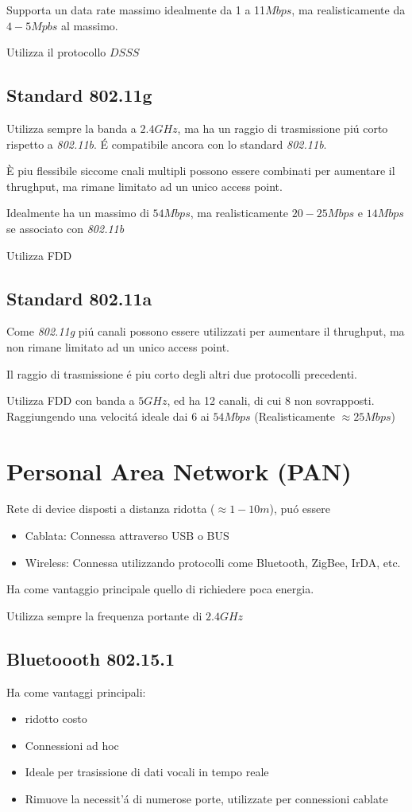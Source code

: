 \documentclass{article}
\begin{document}
Supporta un data rate massimo idealmente da 1 a 11$Mbps$, ma realisticamente da $4-5Mpbs$ al massimo.

Utilizza il protocollo $DSSS$

\subsection{Standard 802.11g}
Utilizza sempre la banda a $2.4GHz$, ma ha un raggio di trasmissione pi\'u corto rispetto a \textit{802.11b}. \'E compatibile ancora con lo standard \textit{802.11b}.

\`E piu flessibile siccome cnali multipli possono essere combinati per aumentare il thrughput, ma rimane limitato ad un unico access point.

Idealmente ha un massimo di $54 Mbps$, ma realisticamente $20-25 Mbps$ e $14 Mbps$ se associato con \textit{802.11b}

Utilizza FDD
\subsection{Standard 802.11a}

Come \textit{802.11g} pi\'u canali possono essere utilizzati per aumentare il thrughput, ma non rimane limitato ad un unico access point.

Il raggio di trasmissione \'e piu corto degli altri due protocolli precedenti.

Utilizza FDD con banda a $5GHz$, ed ha 12 canali, di cui 8 non sovrapposti. Raggiungendo una velocit\'a ideale dai 6 ai $54Mbps$ (Realisticamente $\approx 25 Mbps$)
\newpage
\section{Personal Area Network (PAN)}
Rete di device disposti a distanza ridotta ($\approx 1-10m$), pu\'o essere
\begin{itemize}
    \item Cablata: Connessa attraverso USB o BUS
    \item Wireless: Connessa utilizzando protocolli come Bluetooth, ZigBee, IrDA, etc.
\end{itemize}

Ha come vantaggio principale quello di richiedere poca energia.

Utilizza sempre la frequenza portante di $2.4GHz$

\subsection{Bluetoooth 802.15.1}
Ha come vantaggi principali:
\begin{itemize}
     \item ridotto costo
     \item Connessioni ad hoc
     \item Ideale per trasissione di dati vocali in tempo reale
     \item Rimuove la necessit'\'a di numerose porte, utilizzate per connessioni cablate
\end{itemize}
\end{document}
